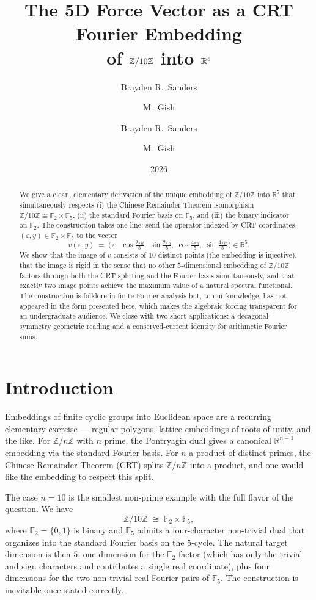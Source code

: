 \documentclass[11pt,reqno]{amsart}
\title[5D Fourier Embedding of \texorpdfstring{$\Z/10\Z$}{Z/10Z}]
  {The 5D Force Vector as a CRT Fourier Embedding\\
   of $\Z/10\Z$ into $\R^5$}
\author{Brayden R.\ Sanders \and M.\ Gish}
\author{Brayden R.\ Sanders \and M.\ Gish}
\date{2026}
\theoremstyle{definition}
\newcommand{\Z}{\mathbb{Z}}
\newcommand{\R}{\mathbb{R}}
\newcommand{\F}{\mathbb{F}}
\begin{document}
\begin{abstract}
We give a clean, elementary derivation of the unique embedding of
$\Z/10\Z$ into $\R^5$ that simultaneously respects (i) the Chinese
Remainder Theorem isomorphism $\Z/10\Z \cong \F_2 \times \F_5$, (ii)
the standard Fourier basis on $\F_5$, and (iii) the binary indicator
on $\F_2$. The construction takes one line: send the operator
indexed by CRT coordinates $(\varepsilon, y) \in \F_2 \times \F_5$
to the vector
\[ v(\varepsilon, y) \;=\;
   \bigl(\,\varepsilon,\;
   \cos\tfrac{2\pi y}{5},\;\sin\tfrac{2\pi y}{5},\;
   \cos\tfrac{4\pi y}{5},\;\sin\tfrac{4\pi y}{5}\,\bigr) \in \R^5. \]
We show that the image of $v$ consists of $10$ distinct points (the
embedding is injective), that the image is rigid in the sense that
no other $5$-dimensional embedding of $\Z/10\Z$ factors through both
the CRT splitting and the Fourier basis simultaneously, and that
exactly two image points achieve the maximum value of a natural
spectral functional. The construction is folklore in finite Fourier
analysis but, to our knowledge, has not appeared in the form
presented here, which makes the algebraic forcing transparent for an
undergraduate audience. We close with two short applications: a
decagonal-symmetry geometric reading and a conserved-current
identity for arithmetic Fourier sums.
\end{abstract}

\maketitle

\section{Introduction}
\label{sec:intro}

Embeddings of finite cyclic groups into Euclidean space are a
recurring elementary exercise --- regular polygons, lattice
embeddings of roots of unity, and the like. For $\Z/n\Z$ with
$n$ prime, the Pontryagin dual gives a canonical $\R^{n-1}$
embedding via the standard Fourier basis. For $n$ a product of
distinct primes, the Chinese Remainder Theorem (CRT) splits
$\Z/n\Z$ into a product, and one would like the embedding to
respect this split.

The case $n = 10$ is the smallest non-prime example with the full
flavor of the question. We have
\[
  \Z/10\Z \;\cong\; \F_2 \times \F_5,
\]
where $\F_2 = \{0,1\}$ is binary and $\F_5$ admits a four-character
non-trivial dual that organizes into the standard Fourier basis on
the $5$-cycle. The natural target dimension is then $5$: one
dimension for the $\F_2$ factor (which has only the trivial and
sign characters and contributes a single real coordinate), plus
four dimensions for the two non-trivial real Fourier pairs of
$\F_5$. The construction is inevitable once stated correctly.
\end{document}
